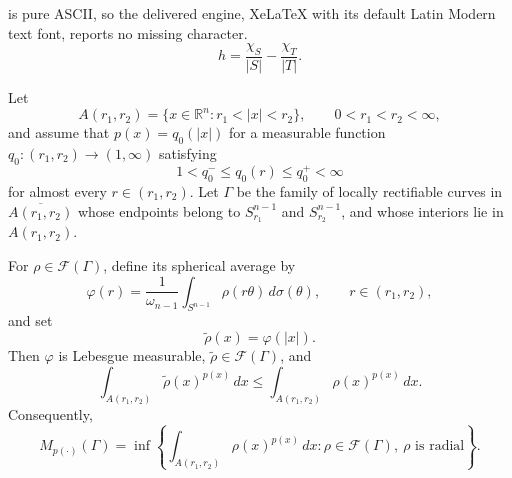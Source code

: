 \documentclass[10pt,a4paper]{amsart}
\begin{document}
is pure ASCII, so the delivered engine, XeLaTeX with its default Latin Modern text font, reports no missing character.
\begin{equation}\label{fun-h}
h
=
\frac{\chi_S}{|S|}
-
\frac{\chi_T}{|T|}.
\end{equation}

\begin{lemma}
\label{lem:radial_suffices}
Let
\begin{equation*}
A(r_1,r_2)
=
\{x\in\mathbb R^n:r_1<|x|<r_2\},
\qquad
0<r_1<r_2<\infty,
\end{equation*}
and assume that
$p(x)=q_0(|x|)$
for a measurable function
$q_0:(r_1,r_2)\longrightarrow(1,\infty)$
satisfying
\begin{equation}
\label{eq:annulus_exp_bounds}
1<q_0^-\le q_0(r)\le q_0^+<\infty
\end{equation}
for almost every $r\in(r_1,r_2)$.
Let $\Gamma$ be the family of locally rectifiable curves in
$\overline{A(r_1,r_2)}$ whose endpoints belong to
$S_{r_1}^{n-1}$ and $S_{r_2}^{n-1}$, and whose interiors
lie in $A(r_1,r_2)$.

For $\rho\in\mathcal F(\Gamma)$, define its spherical average by
\begin{equation}
\label{eq:spherical_average}
\varphi(r)
=
\frac{1}{\omega_{n-1}}
\int_{S^{n-1}}
\rho(r\theta)\,d\sigma(\theta),
\qquad
r\in(r_1,r_2),
\end{equation}
and set
\begin{equation}
\label{eq:radial_average_density}
\widetilde\rho(x)
=
\varphi(|x|).
\end{equation}
Then $\varphi$ is Lebesgue measurable,
$\widetilde\rho\in\mathcal F(\Gamma)$, and
\begin{equation}
\label{eq:radial_energy_reduction}
\int_{A(r_1,r_2)}
\widetilde\rho(x)^{p(x)}\,dx
\le
\int_{A(r_1,r_2)}
\rho(x)^{p(x)}\,dx.
\end{equation}
Consequently,
\begin{equation}
\label{eq:radial_infimum}
M_{p(\cdot)}(\Gamma)
=
\inf\left\{
\int_{A(r_1,r_2)}
\rho(x)^{p(x)}\,dx:
\rho\in\mathcal F(\Gamma),
\ \rho\text{ is radial}
\right\}.
\end{equation}
\end{lemma}
\end{document}
